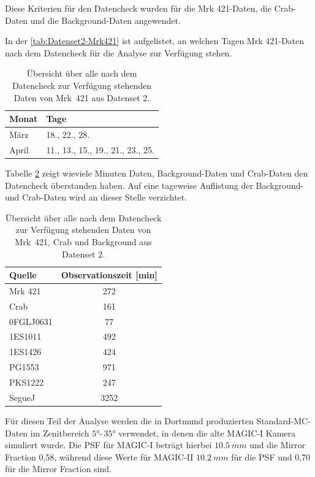 Diese Kriterien für den Datencheck wurden für die Mrk 421-Daten, die Crab-Daten und die Background-Daten angewendet.

In der \autoref{tab:Datenset2-Mrk421} ist aufgelistet, an welchen Tagen Mrk 421-Daten nach dem Datencheck für die Analyse zur Verfügung stehen.


\begin{table}[!h]
\centering
\caption{Übersicht über alle nach dem Datencheck zur Verfügung stehenden Daten von Mrk~421 aus Datenset 2.}
\label{tab:Datenset2-Mrk421}
\begin{tabular}{ll}
  \toprule
  Monat & Tage\\
  \midrule
  \midrule
März & 18., 22., 28.\\
April & 11., 13., 15., 19., 21., 23., 25. \\
  \bottomrule
\end{tabular}
\end{table}

Tabelle \ref{tab:Datenset2} zeigt wieviele Minuten Daten, Background-Daten und Crab-Daten den Datencheck überstanden haben. 
Auf eine tageweise Auflistung der Background- und Crab-Daten wird an dieser Stelle verzichtet.

\begin{table}[!h]
\centering
\caption{Übersicht über alle nach dem Datencheck zur Verfügung stehenden Daten von Mrk~421, Crab und Background aus Datenset 2.}
\label{tab:Datenset2}
\begin{tabular}{lc}
  \toprule
  Quelle & Observationszeit [min]\\
  \midrule
  \midrule
  Mrk 421 & 272\\
  \midrule
  Crab & 161\\
  \midrule
  0FGLJ0631 & 77 \\
  1ES1011 & 492 \\
  1ES1426 & 424 \\
  PG1553 & 971 \\
  PKS1222 & 247 \\
  SegueJ & 3252 \\
  \bottomrule
\end{tabular}
\end{table}

Für diesen Teil der Analyse werden die in Dortmund produzierten Standard-MC-Daten im Zenitbereich $5°$-$\,35°$ verwendet, in denen die alte MAGIC-I Kamera simuliert wurde.
Die PSF für MAGIC-I beträgt hierbei $\SI{10,5}{mm}$ und die Mirror Fraction 0,58, während diese Werte für MAGIC-II $\SI{10,2}{mm}$ für die PSF und 0,70 für die Mirror Fraction sind.

